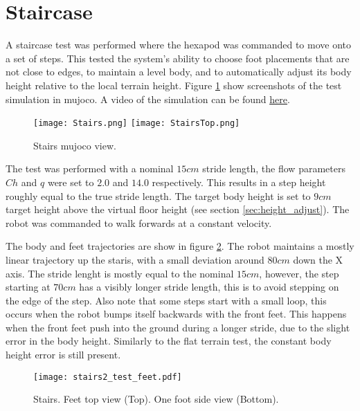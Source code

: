     \section{Staircase}
    A staircase test was performed where the hexapod was commanded to move onto a set of steps. This tested the system's ability to choose foot placements that are not close to edges, to maintain a level body, and to automatically adjust its body height relative to the local terrain height. Figure \ref{fig:stairs} show screenshots of the test simulation in \ac{mujoco}. A video of the simulation can be found \href{https://youtu.be/6v_fmXEp1Vs}{\underline{here}}.
    \begin{figure}[h]
        \centering
        \texttt{[image: Stairs.png]}
        \texttt{[image: StairsTop.png]}
        \caption{Stairs \ac{mujoco} view.}
        \label{fig:stairs}
    \end{figure}

    \noindent
    The test was performed with a nominal \(15cm\) stride length, the flow parameters \(Ch\) and \(q\) were set to \(2.0\) and \(14.0\) respectively. This results in a step height roughly equal to the true stride length. The target body height is set to \(9cm\) target height above the virtual floor height (see section \ref{sec:height_adjust}). The robot was commanded to walk forwards at a constant velocity.

    The body and feet trajectories are show in figure \ref{fig:stairs_feet}. The robot maintains a mostly linear trajectory up the staris, with a small deviation around \(80cm\) down the X axis. The stride lenght is mostly equal to the nominal \(15cm\), however, the step starting at \(70cm\) has a visibly longer stride length, this is to avoid stepping on the edge of the step. Also note that some steps start with a small loop, this occurs when the robot bumps itself backwards with the front feet. This happens when the front feet push into the ground during a longer stride, due to the slight error in the body height. Similarly to the flat terrain test, the constant body height error is still present. 
    \begin{figure}[h]
        \centering
        \texttt{[image: stairs2\_test\_feet.pdf]}
        \caption{Stairs. Feet top view (Top). One foot side view (Bottom).}
        \label{fig:stairs_feet}
    \end{figure}

